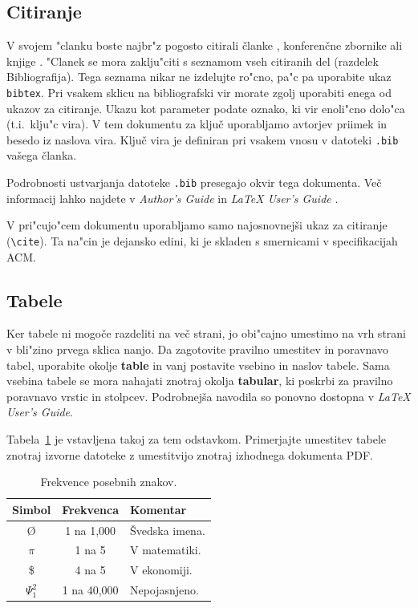 \documentclass[sigconf,nonacm]{acmart}
\begin{document}
\subsection{Citiranje}

V svojem "clanku boste najbr"z pogosto citirali članke \cite{lecun2015deep,
braams:babel, herlihy:methodology}, konferenčne zbornike
\cite{vrbancic2019transfer, clark:pct} ali knjige \cite{salas:calculus,
Lamport:LaTeX, fister2019computational}.  "Clanek se mora zaklju"citi s
seznamom vseh citiranih del (razdelek Bibliografija).  Tega seznama nikar ne
izdelujte ro"cno, pa"c pa uporabite ukaz \texttt{bibtex}.  Pri vsakem sklicu
na bibliografski vir morate zgolj uporabiti enega od ukazov za citiranje.
Ukazu kot parameter podate oznako, ki vir enoli"cno dolo"ca (t.i.\ klju"c
vira).  V tem dokumentu za ključ uporabljamo avtorjev priimek in besedo iz
naslova vira.  Ključ vira je definiran pri vsakem vnosu v datoteki
\texttt{.bib} vašega članka.

Podrobnosti ustvarjanja datoteke \texttt{.bib} presegajo okvir tega dokumenta.
Več informacij lahko najdete v \emph{Author's Guide} in \emph{\LaTeX{} User's
Guide} \cite{Lamport:LaTeX}.

V pri"cujo"cem dokumentu uporabljamo samo najosnovnejši ukaz za citiranje
(\texttt{\textbackslash{}cite}).  Ta na"cin je dejansko edini, ki je skladen s
smernicami v specifikacijah ACM\@.

\subsection{Tabele}

Ker tabele ni mogoče razdeliti na več strani, jo obi"cajno umestimo na vrh
strani v bli"zino prvega sklica nanjo.  Da zagotovite pravilno umestitev in
poravnavo tabel, uporabite okolje \textbf{table} in vanj postavite vsebino in
naslov tabele.  Sama vsebina tabele se mora nahajati znotraj okolja
\textbf{tabular}, ki poskrbi za pravilno poravnavo vrstic in stolpcev.
Podrobnejša navodila so ponovno dostopna v \emph{\LaTeX{} User's Guide}.
    
Tabela~\ref{tab:table1} je vstavljena takoj za tem odstavkom.  Primerjajte
umestitev tabele znotraj izvorne datoteke z umestitvijo znotraj izhodnega
dokumenta PDF\@.

\begin{table}
    \centering
    \caption{Frekvence posebnih znakov.}
    \label{tab:table1}
    \begin{tabular}{ccl}
        \toprule
        Simbol&Frekvenca&Komentar\\
        \midrule
        \O & 1 na 1,000& Švedska imena.\\
        $\pi$ & 1 na 5& V matematiki.\\
        \$ & 4 na 5 & V ekonomiji.\\
        $\Psi^2_1$ & 1 na 40,000& Nepojasnjeno. \\
        \bottomrule
    \end{tabular}
\end{table}
\end{document}

